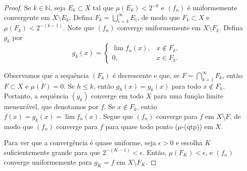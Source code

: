 \begin{proof}
    Se $k \in \mathbb{N}$, seja $E_k \subset X$ tal que $\mu(E_k) < 2^{-k}$ e $(f_n)$ é uniformemente convergente em $X \setminus E_k$. Defina $F_k = \bigcup_{i=k}^{\infty} E_i$, de modo que $F_k \subset X$ e $\mu(F_k) < 2^{-(k-1)}$. Note que $(f_n)$ converge uniformemente em $X \setminus F_k$. Defina $g_k$ por
    \begin{equation*}
        g_k(x) =
        \begin{cases}
            \lim f_n(x), & x \notin F_k, \\
            0, & x \in F_k.
        \end{cases}
    \end{equation*}

    Observamos que a sequência $(F_k)$ é decrescente e que, se $F = \bigcap_{k=1}^{\infty} F_k$, então $F \subset X$ e $\mu(F) = 0$. Se $h \leq k$, então $g_h(x) = g_k(x)$ para todo $x \notin F_h$. Portanto, a sequência $(g_k)$ converge em todo $X$ para uma função limite mensurável, que denotamos por $f$. Se $x \notin F_k$, então $f(x) = g_k(x) = \lim f_n(x)$. Segue que $(f_n)$ converge para $f$ em $X \setminus F$, de modo que $(f_n)$ converge para $f$ para quase todo ponto (\(\mu\)-(qtp)) em $X$.

    Para ver que a convergência é quase uniforme, seja $\epsilon > 0$ e escolha $K$ suficientemente grande para que $2^{-(K-1)} < \epsilon$. Então, $\mu(F_K) < \epsilon$, e $(f_n)$ converge uniformemente para $g_K = f$ em $X \setminus F_K$.
\end{proof}
